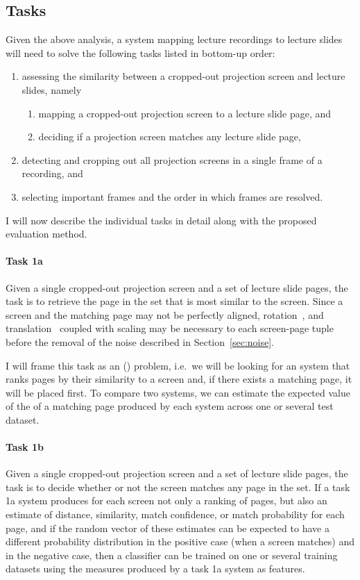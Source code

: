 \subsection{Tasks}
\label{sec:tasks}
Given the above analysis, a system mapping lecture recordings to lecture slides
will need to solve the following tasks listed in bottom-up order:
\begin{enumerate}
  \item assessing the similarity between a cropped-out projection screen and
    lecture slides, namely
    \begin{enumerate}
      \item mapping a cropped-out projection screen to a lecture slide page, and
      \item deciding if a projection screen matches any lecture slide page,
    \end{enumerate}
  \item detecting and cropping out all projection screens in a single frame
    of a recording, and
  \item selecting important frames and the order in which frames are resolved.
\end{enumerate}
I will now describe the individual tasks in detail along with the proposed
evaluation method.

\paragraph{Task 1a} Given a single cropped-out projection screen and a set of
lecture slide pages, the task is to retrieve the page in the set that is most
similar to the screen. Since a screen and the matching page may not be
perfectly aligned, rotation~\cite{smith1995simple}, and
translation~\cite{sarvaiyaetal09} coupled with scaling may be necessary to
 each screen-page tuple before the removal of the noise
described in Section~\ref{sec:noise}.

I will frame this task as an  () problem,
i.e.\ we will be looking for an  system that ranks pages by their
similarity to a screen and, if there exists a matching page, it will be placed
first. To compare two systems, we can estimate the expected value of the
 of a matching page produced by each system across one or several
test dataset.

\paragraph{Task 1b} Given a single cropped-out projection screen and a set of
lecture slide pages, the task is to decide whether or not the screen matches
any page in the set.  If a task 1a system produces for each screen not only a
ranking of pages, but also an estimate of distance, similarity, match
confidence, or match probability for each page, and if the random vector of
these estimates can be expected to have a different probability distribution
in the positive case (when a screen matches) and in the negative case, then a
classifier can be trained on one or several training datasets using the
measures produced by a task 1a system as features.

